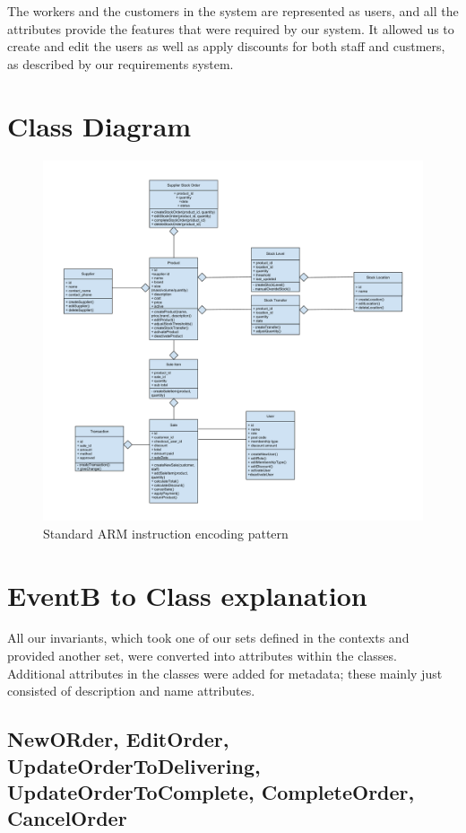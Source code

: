 \documentclass[a4paper]{article}
\begin{document}
The workers and the customers in the system are represented as users, and all the attributes provide the features that were required by our system. It allowed us to create and edit the users as well as apply discounts for both staff and custmers, as described by our requirements system. 

\pagebreak
\section{Class Diagram}

\begin{figure}[h]
\centering
  \includegraphics[scale=0.5]{Class diagram.pdf}
	\caption{Standard ARM instruction encoding pattern}
\end{figure}

\pagebreak
\section{EventB to Class explanation}
All our invariants, which took one of our sets defined in the contexts and provided another set, were converted into attributes within the classes. Additional attributes in the classes were added for metadata; these mainly just consisted of description and name attributes. 

\subsection{NewORder, EditOrder, UpdateOrderToDelivering, UpdateOrderToComplete, CompleteOrder, CancelOrder}
\end{document}

